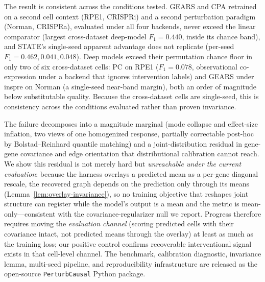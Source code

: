 \documentclass{article}
\theoremstyle{plain}
\theoremstyle{definition}
\theoremstyle{remark}
\begin{document}
The result is consistent across the conditions tested. GEARS and CPA retrained on a second cell context (RPE1, CRISPRi) and a second perturbation paradigm (Norman, CRISPRa), evaluated under all four backends, never exceed the linear comparator (largest cross-dataset deep-model $F_1 = 0.440$, inside its chance band), and STATE's single-seed apparent advantage does not replicate (per-seed $F_1 = 0.462, 0.041, 0.048$). Deep models exceed their permutation chance floor in only two of six cross-dataset cells: PC on RPE1 ($F_1 = 0.078$, observational co-expression under a backend that ignores intervention labels) and GEARS under inspre on Norman (a single-seed near-band margin), both an order of magnitude below substitutable quality. Because the cross-dataset cells are single-seed, this is consistency across the conditions evaluated rather than proven invariance.

The failure decomposes into a magnitude marginal (mode collapse and effect-size inflation, two views of one homogenized response, partially correctable post-hoc by Bolstad--Reinhard quantile matching) and a joint-distribution residual in gene-gene covariance and edge orientation that distributional calibration cannot reach. We show this residual is not merely hard but \emph{unreachable under the current evaluation}: because the harness overlays a predicted mean as a per-gene diagonal rescale, the recovered graph depends on the prediction only through its means (Lemma~\ref{lem:overlay-invariance}), so no training objective that reshapes joint structure can register while the model's output is a mean and the metric is mean-only---consistent with the covariance-regularizer null we report. Progress therefore requires moving the \emph{evaluation channel} (scoring predicted cells with their covariance intact, not predicted means through the overlay) at least as much as the training loss; our positive control confirms recoverable interventional signal exists in that cell-level channel. The benchmark, calibration diagnostic, invariance lemma, multi-seed pipeline, and reproducibility infrastructure are released as the open-source \texttt{PerturbCausal} Python package.

\end{document}
